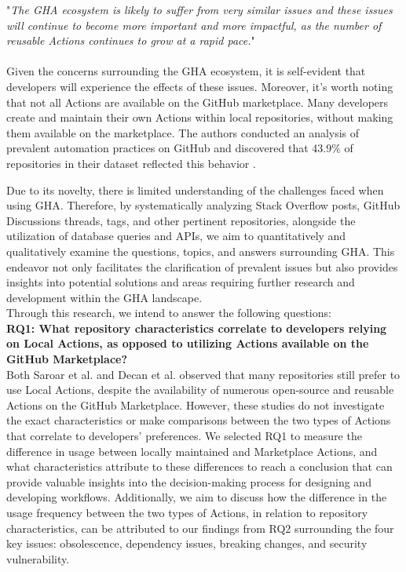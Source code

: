 \documentclass[conference]{IEEEtran}
\begin{document}
"\textit{The GHA ecosystem is likely to suffer from very similar issues and these issues will continue to become more important and more impactful, as the number of reusable Actions continues to grow at a rapid pace.}"\\\\
Given the concerns surrounding the GHA ecosystem, it is self-evident that developers will experience the effects of these issues.  Moreover, it's worth noting that not all Actions are available on the GitHub marketplace. Many developers create and maintain their own Actions within local repositories, without making them available on the marketplace. The authors  conducted an analysis of prevalent automation practices on GitHub and discovered that 43.9\% of repositories in their dataset reflected this behavior \cite{decan2022use}.

    Due to its novelty, there is limited understanding of the challenges faced when using GHA. Therefore,  by systematically analyzing Stack Overflow posts, GitHub Discussions threads, tags, and other pertinent repositories, alongside the utilization of database queries and APIs, we aim to quantitatively and qualitatively examine the questions, topics, and answers surrounding GHA. This endeavor not only facilitates the clarification of prevalent issues but also provides insights into potential solutions and areas requiring further research and development within the GHA landscape.\\

    Through this research, we intend to answer the following questions:\\

    \textbf{RQ1: What repository characteristics correlate to developers relying on Local Actions, as opposed to utilizing Actions available on the GitHub Marketplace?}\\

    Both Saroar et al. \cite{saroar2023developers} and Decan et al. \cite{decan2022use} observed that many repositories still prefer to use Local Actions, despite the availability of numerous open-source and reusable Actions on the GitHub Marketplace. However, these studies do not investigate the exact characteristics or make comparisons between the two types of Actions that correlate to developers' preferences. We selected RQ1 to measure the difference in usage between locally maintained and Marketplace Actions, and what characteristics attribute to these differences to reach a conclusion that can provide valuable insights into the decision-making process for designing and developing workflows. Additionally, we aim to discuss how the difference in the usage frequency between the two types of Actions, in relation to repository characteristics, can be attributed to our findings from RQ2 surrounding the four key issues: obsolescence, dependency issues, breaking changes, and security vulnerability.
\end{document}
